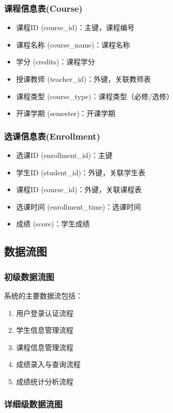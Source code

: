 \documentclass{zjut-report}
\begin{document}
\subsubsection{课程信息表(Course)}
\begin{itemize}
\item 课程ID (course\_id)：主键，课程编号
\item 课程名称 (course\_name)：课程名称
\item 学分 (credits)：课程学分
\item 授课教师 (teacher\_id)：外键，关联教师表
\item 课程类型 (course\_type)：课程类型（必修/选修）
\item 开课学期 (semester)：开课学期
\end{itemize}

\subsubsection{选课信息表(Enrollment)}
\begin{itemize}
\item 选课ID (enrollment\_id)：主键
\item 学生ID (student\_id)：外键，关联学生表
\item 课程ID (course\_id)：外键，关联课程表
\item 选课时间 (enrollment\_time)：选课时间
\item 成绩 (score)：学生成绩
\end{itemize}

\subsection{数据流图}

\subsubsection{初级数据流图}

系统的主要数据流包括：
\begin{enumerate}
\item 用户登录认证流程
\item 学生信息管理流程
\item 课程信息管理流程
\item 成绩录入与查询流程
\item 成绩统计分析流程
\end{enumerate}

\subsubsection{详细级数据流图}
\end{document}
